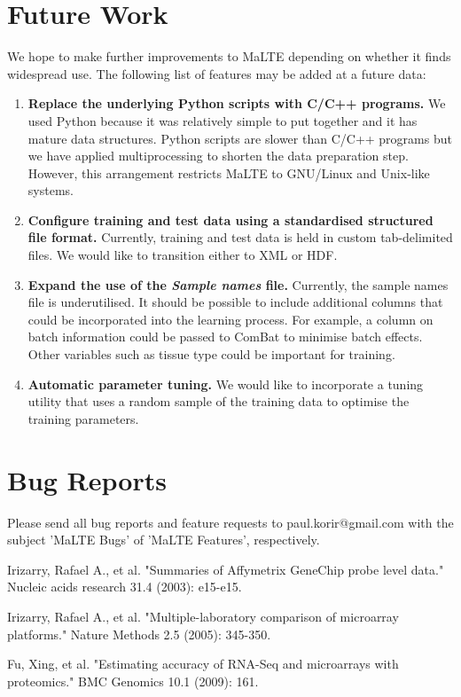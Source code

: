\documentclass[a4paper,12pt]{article}
\begin{document}
\section{Future Work}
We hope to make further improvements to MaLTE depending on whether it finds widespread use. The following list of features may be added at a future data:
\begin{enumerate}
\item \textbf{Replace the underlying Python scripts with C/C++ programs.} We used Python because it was relatively simple to put together and it has mature data structures. Python scripts are slower than C/C++ programs but we have applied multiprocessing to shorten the data preparation step. However, this arrangement restricts MaLTE to GNU/Linux and Unix-like systems.
\item \textbf{Configure training and test data using a standardised structured file format.} Currently, training and test data is held in custom tab-delimited files. We would like to transition either to XML or HDF.
\item \textbf{Expand the use of the \textit{Sample names} file.} Currently, the sample names file is underutilised. It should be possible to include additional columns that could be incorporated into the learning process. For example, a column on batch information could be passed to ComBat to minimise batch effects. Other variables such as tissue type could be important for training.
\item \textbf{Automatic parameter tuning.} We would like to incorporate a tuning utility that uses a random sample of the training data to optimise the training parameters.
\end{enumerate}

\section{Bug Reports}
Please send all bug reports and feature requests to paul.korir@gmail.com with the subject 'MaLTE Bugs' of 'MaLTE Features', respectively.


\begin{thebibliography}{50}

 Irizarry, Rafael A., et al. "Summaries of Affymetrix GeneChip probe level data." Nucleic acids research 31.4 (2003): e15-e15.

 Irizarry, Rafael A., et al. "Multiple-laboratory comparison of microarray platforms." Nature Methods 2.5 (2005): 345-350.

 Fu, Xing, et al. "Estimating accuracy of RNA-Seq and microarrays with proteomics." BMC Genomics 10.1 (2009): 161.

\end{thebibliography}
\end{document}
